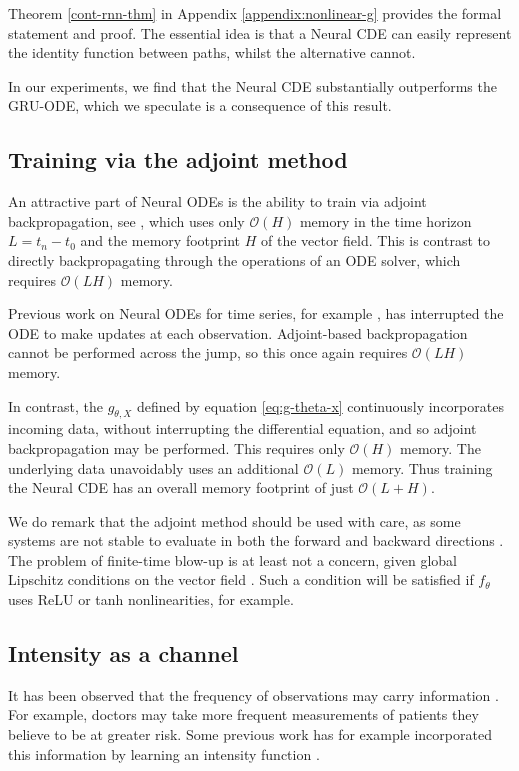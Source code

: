 \documentclass{article}
\theoremstyle{plain}
\theoremstyle{definition}
\newcommand{\bigO}{\mathcal{O}}
\begin{document}
	Theorem \ref{cont-rnn-thm} in Appendix \ref{appendix:nonlinear-g} provides the formal statement and proof. The essential idea is that a Neural CDE can easily represent the identity function between paths, whilst the alternative cannot.
	
	In our experiments, we find that the Neural CDE substantially outperforms the GRU-ODE, which we speculate is a consequence of this result.
	
	\subsection{Training via the adjoint method}\label{subsection:train}
	An attractive part of Neural ODEs is the ability to train via adjoint backpropagation, see \cite{neural-odes, pontryagin, Giles2000, Hager2000}, which uses only $\bigO(H)$ memory in the time horizon $L = t_n - t_0$ and the memory footprint $H$ of the vector field. This is contrast to directly backpropagating through the operations of an ODE solver, which requires $\bigO(LH)$ memory.
	
	Previous work on Neural ODEs for time series, for example \cite{latent-odes}, has interrupted the ODE to make updates at each observation. Adjoint-based backpropagation cannot be performed across the jump, so this once again requires $\bigO(LH)$ memory. %
	
	In contrast, the $g_{\theta, X}$ defined by equation \eqref{eq:g-theta-x} continuously incorporates incoming data, without interrupting the differential equation, and so adjoint backpropagation may be performed. This requires only $\bigO(H)$ memory. The underlying data unavoidably uses an additional $\bigO(L)$ memory. Thus training the Neural CDE has an overall memory footprint of just $\bigO(L + H)$.	
	
	We do remark that the adjoint method should be used with care, as some systems are not stable to evaluate in both the forward and backward directions \cite{anode, anode2}. The problem of finite-time blow-up is at least not a concern, given global Lipschitz conditions on the vector field \cite[Theorem 1.3]{levy-lyons}. Such a condition will be satisfied if $f_\theta$ uses ReLU or tanh nonlinearities, for example.
	
	\subsection{Intensity as a channel}\label{section:observational-intensity}
	It has been observed that the frequency of observations may carry information \cite{Che2018}. For example, doctors may take more frequent measurements of patients they believe to be at greater risk. Some previous work has for example incorporated this information by learning an intensity function \cite{interpolation-prediction, latent-odes, neural-odes}.
	
\end{document}

